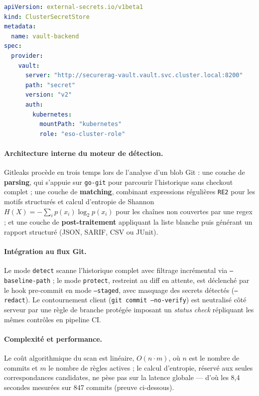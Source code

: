 \begin{lstlisting}[language=yaml, caption={Extrait réel du ClusterSecretStore ESO relié à Vault (\texttt{infra/k8s/secrets/eso-cluster-secret-store.yaml})}, label={lst:eso_cluster_secret_store_reel}]
apiVersion: external-secrets.io/v1beta1
kind: ClusterSecretStore
metadata:
  name: vault-backend
spec:
  provider:
    vault:
      server: "http://securerag-vault.vault.svc.cluster.local:8200"
      path: "secret"
      version: "v2"
      auth:
        kubernetes:
          mountPath: "kubernetes"
          role: "eso-cluster-role"
\end{lstlisting}

\paragraph{Architecture interne du moteur de détection.} Gitleaks procède en trois temps lors de l'analyse d'un blob Git : une couche de \textbf{parsing}, qui s'appuie sur \texttt{go-git} pour parcourir l'historique sans checkout complet ; une couche de \textbf{matching}, combinant expressions régulières \texttt{RE2} pour les motifs structurés et calcul d'entropie de Shannon $H(X) = -\sum_{i} p(x_i) \log_2 p(x_i)$ pour les chaînes non couvertes par une regex ; et une couche de \textbf{post-traitement} appliquant la liste blanche puis générant un rapport structuré (JSON, SARIF, CSV ou JUnit).

\paragraph{Intégration au flux Git.} Le mode \texttt{detect} scanne l'historique complet avec filtrage incrémental via \texttt{--baseline-path} ; le mode \texttt{protect}, restreint au diff en attente, est déclenché par le hook pre-commit en mode \texttt{--staged}, avec masquage des secrets détectés (\texttt{--redact}). Le contournement client (\texttt{git commit --no-verify}) est neutralisé côté serveur par une règle de branche protégée imposant un \textit{status check} répliquant les mêmes contrôles en pipeline CI.

\paragraph{Complexité et performance.} Le coût algorithmique du scan est linéaire, $O(n \cdot m)$, où $n$ est le nombre de commits et $m$ le nombre de règles actives ; le calcul d'entropie, réservé aux seules correspondances candidates, ne pèse pas sur la latence globale — d'où les 8,4 secondes mesurées sur 847 commits (preuve ci-dessous).

